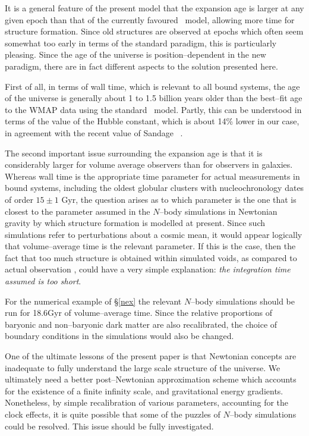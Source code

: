 \documentclass[12pt]{article}
\begin{document}
It is a general feature of the present model that the expansion age
is larger at any given epoch than that of the currently favoured
\LCDM\ model, allowing more time for structure formation. Since
old structures are observed at epochs which often seem somewhat too
early in terms of the standard paradigm, this is particularly pleasing.
Since the age of the universe is position--dependent in the new
paradigm, there are in fact different aspects to the solution presented
here.

First of all, in terms of wall time, which is relevant to all bound
systems, the age of the universe is generally about 1 to 1.5 billion
years older than the best--fit age to the WMAP data \cite{wmap} using
the standard \LCDM\ model. Partly, this can be understood in terms of
the value of the Hubble constant, which is about 14\% lower in our case, in
agreement with the recent value of Sandage \etal\ \cite{Sandage}.

The second important issue surrounding the expansion age is that it is
considerably larger for volume average observers than for observers
in galaxies. Whereas wall time is the appropriate time parameter for
actual measurements in bound systems, including the oldest globular clusters
with nucleochronology dates of order $15\pm1$ Gyr, the question arises as
to which parameter is the one that is closest to the parameter assumed in
the $N$--body simulations in Newtonian gravity by which structure formation
is modelled at present. Since such simulations refer to perturbations
about a cosmic mean, it would appear logically that volume--average
time is the relevant parameter. If this is the case, then the fact
that too much structure is obtained within simulated voids, as compared to
actual observation \cite{P_void,P_void2}, could have a very simple
explanation: {\em the integration time assumed is too short}.

For the numerical example of \S\ref{nex} the relevant $N$--body simulations
should be run for 18.6Gyr of volume--average time. Since the relative
proportions of baryonic and non--baryonic dark matter are also recalibrated,
the choice of boundary conditions in the simulations would also be changed.

One of the ultimate lessons of the present paper is that Newtonian concepts
are inadequate to fully understand the large scale structure of the universe.
We ultimately need a better post--Newtonian approximation scheme which
accounts for the existence of a finite infinity scale, and gravitational
energy gradients. Nonetheless, by simple recalibration of various parameters,
accounting for the clock effects, it is quite possible that some of the
puzzles of $N$--body simulations could be resolved. This issue should be
fully investigated.
\end{document}
